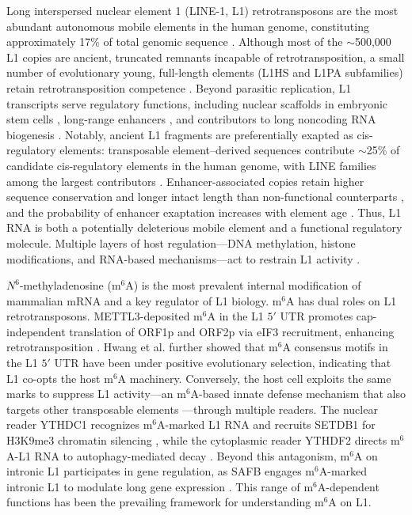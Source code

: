 \documentclass[11pt]{article}
\newcommand{\msix}{m$^6$A}
\newcommand{\LONE}{LINE-1}
\begin{document}
Long interspersed nuclear element 1 (\LONE{}, L1) retrotransposons are the
most abundant autonomous mobile elements in the human genome, constituting
approximately 17\% of total genomic sequence \citep{Bourque2018}. Although
most of the $\sim$500,000 L1 copies are ancient, truncated remnants
incapable of retrotransposition, a small number of evolutionary young,
full-length elements (L1HS and L1PA subfamilies) retain
retrotransposition competence \citep{Lanciano2020}. Beyond parasitic
replication, L1 transcripts serve regulatory functions, including nuclear
scaffolds in embryonic stem cells \citep{Percharde2018}, long-range
enhancers \citep{LiX2024}, and contributors to long noncoding RNA
biogenesis \citep{Kapusta2013}. Notably, ancient L1 fragments are
preferentially exapted as cis-regulatory elements: transposable
element--derived sequences contribute $\sim$25\% of candidate
cis-regulatory elements in the human genome, with LINE families among
the largest contributors \citep{Du2024encode}. Enhancer-associated
copies retain higher sequence conservation and longer intact length
than non-functional counterparts \citep{Nishihara2019}, and the
probability of enhancer exaptation increases with element age
\citep{Simonti2017}. Thus, L1 RNA is both a potentially
deleterious mobile element and a functional regulatory molecule. Multiple
layers of host regulation---DNA methylation, histone modifications, and
RNA-based mechanisms---act to restrain L1 activity \citep{Deniz2019}.

$N^6$-methyladenosine (\msix{}) is the most prevalent internal
modification of mammalian mRNA and a key regulator of L1 biology. \msix{}
has dual roles on L1 retrotransposons. METTL3-deposited \msix{} in the L1
$5'$ UTR promotes cap-independent translation of ORF1p and ORF2p via eIF3
recruitment, enhancing retrotransposition \citep{Hwang2021}. Hwang
et al. further showed that \msix{} consensus motifs in the L1 $5'$ UTR
have been under positive evolutionary selection, indicating that L1
co-opts the host \msix{} machinery. Conversely, the host cell exploits
the same marks to suppress L1 activity---an \msix{}-based innate defense
mechanism that also targets other transposable elements
\citep{Chelmicki2021}---through multiple readers. The nuclear reader
YTHDC1 recognizes \msix{}-marked L1 RNA and recruits SETDB1 for H3K9me3
chromatin silencing \citep{Liu2021}, while the cytoplasmic reader YTHDF2
directs \msix{}-L1 RNA to autophagy-mediated decay \citep{Tian2024}.
Beyond this antagonism, \msix{} on intronic L1 participates in gene
regulation, as SAFB engages \msix{}-marked intronic L1 to modulate long
gene expression \citep{Xiong2021}. This range of \msix{}-dependent
functions has been the prevailing framework for understanding \msix{} on
L1.
\end{document}

